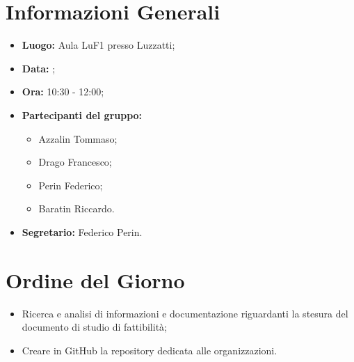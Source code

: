 \section{Informazioni Generali}
\begin{itemize}
\item \textbf{Luogo:} Aula LuF1 presso Luzzatti;
\item \textbf{Data:} \Data;
\item \textbf{Ora:} 10:30 - 12:00;
\item \textbf{Partecipanti del gruppo:}
	\begin{itemize}
	\item Azzalin Tommaso; 
	\item Drago Francesco;
	\item Perin Federico;
	\item Baratin Riccardo.
	\end{itemize} 
\item \textbf{Segretario:} Federico Perin.
\end{itemize}

\section{Ordine del Giorno}
\begin{itemize}
\item Ricerca e analisi di informazioni e documentazione riguardanti la stesura del documento di studio di fattibilità;
\item Creare in GitHub la repository dedicata alle organizzazioni.
\end{itemize}

\clearpage
